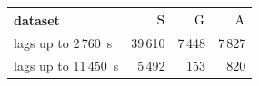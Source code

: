 \begin{tabular}{@{}l r r r@{}}
\toprule
dataset & $\mathrm{S}$ & $\mathrm{G}$ & $\mathrm{A}$ \\
\midrule
lags up to 2\,760~s & 39\,610 & 7\,448 & 7\,827 \\
lags up to 11\,450~s & 5\,492 & 153 & 820 \\
\bottomrule
\end{tabular}
